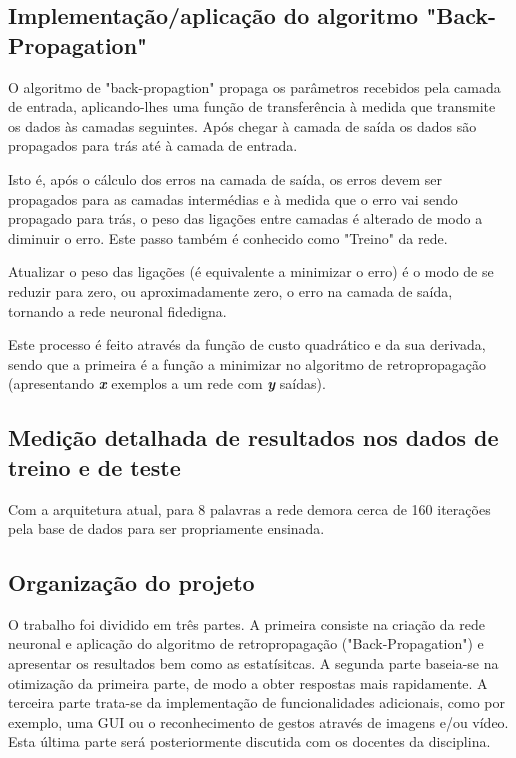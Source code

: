 \documentclass[10pt,a4paper]{article}
\begin{document}
\subsection{Implementação/aplicação do algoritmo "Back-Propagation"}
\subitem

O algoritmo de "back-propagtion" propaga os parâmetros recebidos pela camada de entrada, aplicando-lhes uma função de transferência à medida que transmite os dados às camadas seguintes. Após chegar à camada de saída os dados são propagados para trás até à camada de entrada.

Isto é, após o cálculo dos erros na camada de saída, os erros devem ser propagados para as camadas intermédias e à medida que o erro vai sendo propagado para trás, o peso das ligações entre camadas é alterado de modo a diminuir o erro. Este passo também é conhecido como "Treino" da rede.

Atualizar o peso das ligações (é equivalente a minimizar o erro) é o modo de se reduzir para zero, ou aproximadamente zero, o erro na camada de saída, tornando a rede neuronal fidedigna.

Este processo é feito através da função de custo quadrático e da sua derivada, sendo que a primeira é a função a minimizar no algoritmo de retropropagação (apresentando \textbf{\textit{x}} exemplos a um rede com \textbf{\textit{y}} saídas).


\subsection{Medição detalhada de resultados nos dados de treino e de teste}
\subitem

Com a arquitetura atual, para 8 palavras a rede demora cerca de 160 iterações pela base de dados para ser propriamente ensinada.

\subsection{Organização do projeto}
\subitem

O trabalho foi dividido em três partes. 
A primeira consiste na criação da rede neuronal e aplicação do algoritmo de retropropagação ("Back-Propagation") e apresentar os resultados bem como as estatísitcas.
A segunda parte baseia-se na otimização da primeira parte, de modo a obter respostas mais rapidamente.
A terceira parte trata-se da implementação de funcionalidades adicionais, como por exemplo, uma GUI ou o reconhecimento de gestos através de imagens e/ou vídeo. Esta última parte será posteriormente discutida com os docentes da disciplina.
\end{document}
